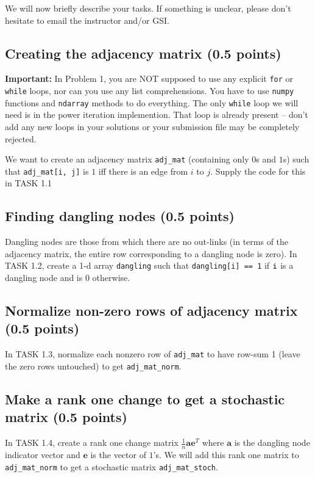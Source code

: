\documentclass{article}
\begin{document}
We will now briefly describe your tasks. If something is unclear, please don't hesitate to email the instructor and/or GSI.

\subsection{Creating the adjacency matrix (0.5 points)}

{\bf Important:} In Problem 1, you are NOT supposed to use any explicit \verb#for# or \verb#while# loops, nor can you use any list comprehensions. You have to use \verb#numpy# functions and \verb#ndarray# methods to do everything. The only \verb#while# loop we will need is in the power iteration implemention. That loop is already present -- don't add any new loops in your solutions or your submission file may be completely rejected.

We want to create an adjacency matrix \verb#adj_mat# (containing only $0$s and $1$s) such that \verb#adj_mat[i, j]# is $1$ iff there is an edge from $i$ to $j$. Supply the code for this in TASK 1.1

\subsection{Finding  dangling nodes (0.5 points)}

Dangling nodes are those from which there are no out-links (in terms of the adjacency matrix, the entire row corresponding to a dangling node is zero). In TASK 1.2, create a 1-d array {\tt dangling} such that {\tt dangling[i] == 1} if ${\tt i}$ is a dangling node and is $0$ otherwise.

\subsection{Normalize non-zero rows of adjacency matrix (0.5 points)}

In TASK 1.3, normalize each nonzero row of \verb#adj_mat# to have row-sum 1 (leave the zero rows untouched) to get \verb#adj_mat_norm#.

\subsection{Make a rank one change to get a stochastic matrix (0.5 points)}

In TASK 1.4, create a rank one change matrix $\frac{1}{n} \mathbf{a} \mathbf{e}^T$ where $\mathbf{a}$ is the dangling node indicator vector and $\mathbf{e}$ is the vector of $1$'s.
We will add this rank one matrix to {\tt adj\_mat\_norm} to get a stochastic matrix {\tt adj\_mat\_stoch}.
\end{document}
